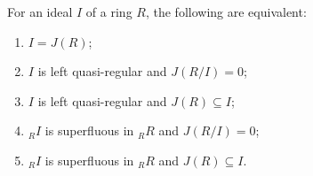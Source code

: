 For an ideal $I$ of a ring $R$, the following are equivalent:
\begin{enumerate}
\item[(a)] $I = J(R)$;
\item[(b)] $I$ is left quasi-regular and $J(R/I) = 0$;
\item[(c)] $I$ is left quasi-regular and $J(R) \subseteq I$;
\item[(d)] ${}_R I$ is superfluous in ${}_R R$ and $J(R/I) = 0$;
\item[(e)] ${}_R I$ is superfluous in ${}_R R$ and $J(R) \subseteq I$.
\end{enumerate}
